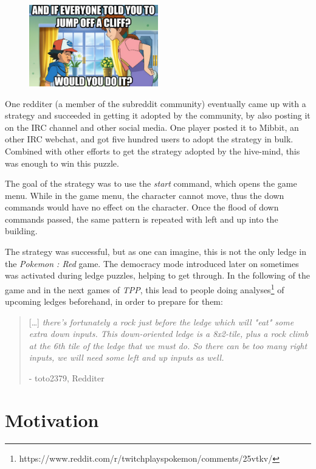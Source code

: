 \documentclass[a4paper]{article}
\begin{document}
\begin{figure}[h]
\includegraphics[width=0.5\textwidth,center]{pictures/ledge2.png}
\end{figure}

One redditer (a member of the subreddit community) eventually came up with a strategy and succeeded in getting it adopted by the community, by also posting it on the IRC channel and other social media. One player posted it to Mibbit, an other IRC webchat, and got five hundred users to adopt the strategy in bulk. Combined with other efforts to get the strategy adopted by the hive-mind, this was enough to win this puzzle.

The goal of the strategy was to use the \textit{start} command, which opens the game menu. While in the game menu, the character cannot move, thus the down commands would have no effect on the character. Once the flood of down commands passed, the same pattern is repeated with left and up into the building.

The strategy was successful, but as one can imagine, this is not the only ledge in the \textit{Pokemon : Red} game. The democracy mode introduced later on sometimes was activated during ledge puzzles, helping to get through. In the following of the game and in the next games of \textit{TPP}, this lead to people doing analyses\footnote{https://www.reddit.com/r/twitchplayspokemon/comments/25vtkv/} of upcoming ledges beforehand, in order to prepare for them:

\begin{quote}
[\dots] \textit{there's fortunately a rock just before the ledge which will "eat" some extra down inputs. This down-oriented ledge is a 8x2-tile, plus a rock climb at the 6th tile of the ledge that we must do. So there can be too many right inputs, we will need some left and up inputs as well.}\par
\hfill\hfill- toto2379, Redditer
\end{quote}

\section{Motivation}
\end{document}

